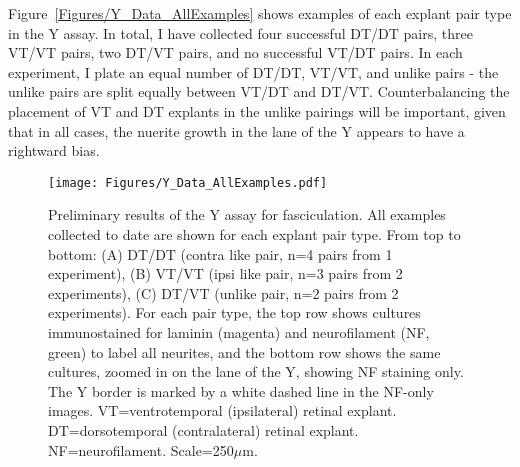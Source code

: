 Figure~\ref{Figures/Y_Data_AllExamples} shows examples of each explant pair type in the Y assay.
In total, I have collected four successful DT/DT pairs, three VT/VT pairs, two DT/VT pairs, and no successful VT/DT pairs.
In each experiment, I plate an equal number of DT/DT, VT/VT, and unlike pairs - the unlike pairs are split equally between VT/DT and DT/VT.
Counterbalancing the placement of VT and DT explants in the unlike pairings will be important, given that in all cases, the nuerite growth in the lane of the Y appears to have a rightward bias.
\begin{figure}[hbtp]
    \begin{center}
        \texttt{[image: Figures/Y\_Data\_AllExamples.pdf]}
        \caption[Preliminary results of the Y assay for fasciculation.]
        {Preliminary results of the Y assay for fasciculation.
        All examples collected to date are shown for each explant pair type.
        From top to bottom: (A) DT/DT (contra like pair, n=4 pairs from 1 experiment), (B) VT/VT (ipsi like pair, n=3 pairs from 2 experiments), (C) DT/VT (unlike pair, n=2 pairs from 2 experiments).
        For each pair type, the top row shows cultures immunostained for laminin (magenta) and neurofilament (NF, green) to label all neurites, and the bottom row shows the same cultures, zoomed in on the lane of the Y, showing NF staining only.
        The Y border is marked by a white dashed line in the NF-only images.
        VT=ventrotemporal (ipsilateral) retinal explant.
        DT=dorsotemporal (contralateral) retinal explant.
        NF=neurofilament.
        Scale=250$\mu$m.
        }
        \label{Figures/YDataAllExamples}
    \end{center}
\end{figure}

